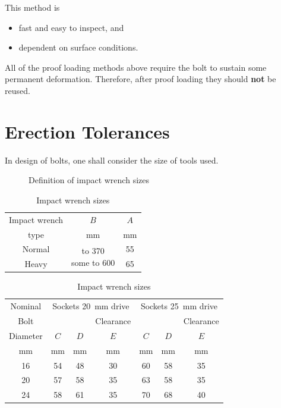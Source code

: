 \begin{enumerate}
\begin{figure}[H]
\end{figure}
This method is
\begin{itemize}
\item fast and easy to inspect, and
\item dependent on surface conditions.
\end{itemize}
\end{enumerate}
All of the proof loading methods above require the bolt to sustain some permanent deformation. Therefore, after proof loading they should \textbf{not} be reused.
\section{Erection Tolerances}
In design of bolts, one shall consider the size of tools used.
\begin{figure}[H]
\centering\caption{Definition of impact wrench sizes \citep{ASI2016}}
\end{figure}

\begin{table}[H]
\centering\caption{Impact wrench sizes \citep{ASI2016}}
\begin{tabular}{ccc}
	\toprule
	Impact wrench &                                $B$                                &   $A$    \\
	    type      &                             \si{\mm}                              & \si{\mm} \\ \midrule
	   Normal     & \multirow{2}[0]{*}{\parbox{5cm}{\centering{}to 370\\some to 600}} &    55    \\
	    Heavy     &                                                                   &    65    \\ \bottomrule
\end{tabular}
\end{table}
\begin{table}[H]
\centering\caption{Impact wrench sizes \citep{ASI2016}}
\begin{tabular}{ccccccc}
	\toprule
	Nominal  & \multicolumn{3}{c}{Sockets \SI{20}{\mm} drive} & \multicolumn{3}{c}{Sockets \SI{25}{\mm} drive} \\
	  Bolt   &          &          &        Clearance         &          &          &        Clearance         \\
	Diameter &   $C$    &   $D$    &           $E$            &   $C$    &   $D$    &           $E$            \\
	\si{\mm} & \si{\mm} & \si{\mm} &         \si{\mm}         & \si{\mm} & \si{\mm} &         \si{\mm}         \\ \midrule
	   16    &    54    &    48    &            30            &    60    &    58    &            35            \\
	   20    &    57    &    58    &            35            &    63    &    58    &            35            \\
	   24    &    58    &    61    &            35            &    70    &    68    &            40            \\ \bottomrule
\end{tabular}
\end{table}


